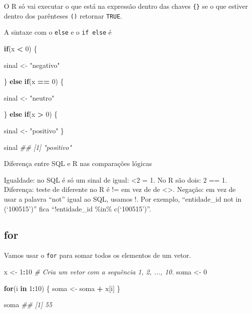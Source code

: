 \documentclass[]{book}
\newenvironment{Shaded}{\begin{snugshade}}{\end{snugshade}}
\newcommand{\CommentTok}[1]{\textcolor[rgb]{0.56,0.35,0.01}{\textit{#1}}}
\newcommand{\ControlFlowTok}[1]{\textcolor[rgb]{0.13,0.29,0.53}{\textbf{#1}}}
\newcommand{\DecValTok}[1]{\textcolor[rgb]{0.00,0.00,0.81}{#1}}
\newcommand{\NormalTok}[1]{#1}
\newcommand{\OperatorTok}[1]{\textcolor[rgb]{0.81,0.36,0.00}{\textbf{#1}}}
\newcommand{\StringTok}[1]{\textcolor[rgb]{0.31,0.60,0.02}{#1}}
\begin{document}
O R só vai executar o que está na expressão dentro das chaves \texttt{\{\}} se o que estiver dentro dos parênteses \texttt{()} retornar \texttt{TRUE}.

A sintaxe com o \texttt{else} e o \texttt{if\ else} é

\begin{Shaded}
\begin{Highlighting}[]
\ControlFlowTok{if}\NormalTok{(x }\OperatorTok{<}\StringTok{ }\DecValTok{0}\NormalTok{) \{}
  
\NormalTok{  sinal <-}\StringTok{ "negativo"}
  
\NormalTok{\} }\ControlFlowTok{else} \ControlFlowTok{if}\NormalTok{(x }\OperatorTok{==}\StringTok{ }\DecValTok{0}\NormalTok{) \{}
  
\NormalTok{  sinal <-}\StringTok{ "neutro"}
  
\NormalTok{\} }\ControlFlowTok{else} \ControlFlowTok{if}\NormalTok{(x }\OperatorTok{>}\StringTok{ }\DecValTok{0}\NormalTok{) \{}
  
\NormalTok{  sinal <-}\StringTok{ "positivo"}
\NormalTok{\}}

\NormalTok{sinal}
\CommentTok{## [1] "positivo"}
\end{Highlighting}
\end{Shaded}

Diferença entre SQL e R nas comparações lógicas

Igualdade: no SQL é só um sinal de igual: \textless2 = 1. No R são dois: 2 == 1.
Diferença: teste de diferente no R é != em vez de de \textless\textgreater.
Negação: em vez de usar a palavra ``not'' igual ao SQL, usamos !. Por exemplo, ``entidade\_id not in (`100515')'' fica ``!entidade\_id \%in\% c(`100515')''.

\hypertarget{for}{%
\subsection{for}\label{for}}

Vamos usar o \texttt{for} para somar todos os elementos de um vetor.

\begin{Shaded}
\begin{Highlighting}[]
\NormalTok{x <-}\StringTok{ }\DecValTok{1}\OperatorTok{:}\DecValTok{10}   \CommentTok{# Cria um vetor com a sequência 1, 2, ..., 10.}
\NormalTok{soma <-}\StringTok{ }\DecValTok{0}

\ControlFlowTok{for}\NormalTok{(i }\ControlFlowTok{in} \DecValTok{1}\OperatorTok{:}\DecValTok{10}\NormalTok{) \{}
\NormalTok{  soma <-}\StringTok{ }\NormalTok{soma }\OperatorTok{+}\StringTok{ }\NormalTok{x[i]}
\NormalTok{\}}

\NormalTok{soma}
\CommentTok{## [1] 55}
\end{Highlighting}
\end{Shaded}
\end{document}

